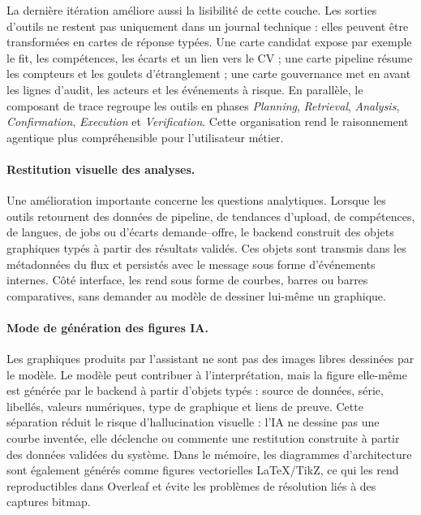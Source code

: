 La dernière itération améliore aussi la lisibilité de cette couche. Les sorties d'outils ne restent pas uniquement dans un journal technique : elles peuvent être transformées en cartes de réponse typées. Une carte candidat expose par exemple le fit, les compétences, les écarts et un lien vers le CV ; une carte pipeline résume les compteurs et les goulets d'étranglement ; une carte gouvernance met en avant les lignes d'audit, les acteurs et les événements à risque. En parallèle, le composant de trace regroupe les outils en phases \textit{Planning}, \textit{Retrieval}, \textit{Analysis}, \textit{Confirmation}, \textit{Execution} et \textit{Verification}. Cette organisation rend le raisonnement agentique plus compréhensible pour l'utilisateur métier.

\paragraph{Restitution visuelle des analyses.}
Une amélioration importante concerne les questions analytiques. Lorsque les outils retournent des données de pipeline, de tendances d'upload, de compétences, de langues, de jobs ou d'écarts demande--offre, le backend construit des objets graphiques typés à partir des résultats validés. Ces objets sont transmis dans les métadonnées du flux et persistés avec le message sous forme d'événements internes. Côté interface,  les rend sous forme de courbes, barres ou barres comparatives, sans demander au modèle de dessiner lui-même un graphique.

\paragraph{Mode de génération des figures IA.}
Les graphiques produits par l'assistant ne sont pas des images libres dessinées par le modèle. Le modèle peut contribuer à l'interprétation, mais la figure elle-même est générée par le backend à partir d'objets typés : source de données, série, libellés, valeurs numériques, type de graphique et liens de preuve. Cette séparation réduit le risque d'hallucination visuelle : l'IA ne dessine pas une courbe inventée, elle déclenche ou commente une restitution construite à partir des données validées du système. Dans le mémoire, les diagrammes d'architecture sont également générés comme figures vectorielles \LaTeX{}/TikZ, ce qui les rend reproductibles dans Overleaf et évite les problèmes de résolution liés à des captures bitmap.

